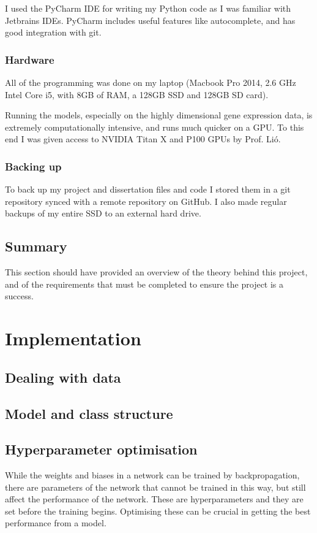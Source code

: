 \documentclass[12pt,a4paper,twoside,openright]{report}
\begin{document}
I used the PyCharm IDE for writing my Python code as I was familiar with Jetbrains IDEs.
PyCharm includes useful features like autocomplete, and has good integration with git.

\subsection{Hardware}

All of the programming was done on my laptop (Macbook Pro 2014, 2.6 GHz Intel Core i5, with 8GB of RAM, a 128GB SSD and 128GB SD card).

Running the models, especially on the highly dimensional gene expression data, is extremely computationally intensive, and runs much 
quicker on a GPU. To this end I was given access to NVIDIA Titan X and P100 GPUs by Prof. Li\'o.

\subsection{Backing up}

To back up my project and dissertation files and code I stored them in a git repository synced with a remote repository on GitHub. I also 
made regular backups of my entire SSD to an external hard drive.

\section{Summary}

This section should have provided an overview of the theory behind this project, and of the requirements that must be completed to 
ensure the project is a success.

\chapter{Implementation}

\section{Dealing with data}

\section{Model and class structure}

\section{Hyperparameter optimisation}
While the weights and biases in a network can be trained by backpropagation, there are parameters of the network that cannot be trained in 
this way, but still affect the performance of the network. These are hyperparameters and they are set before the training begins. 
Optimising these can be crucial in getting the best performance from a model.
\end{document}
